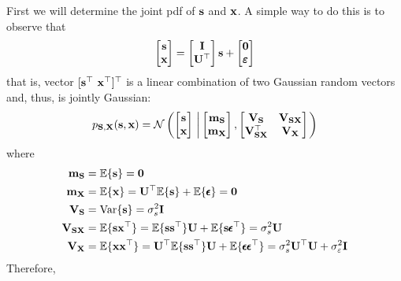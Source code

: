 First we will determine the joint pdf of ${\mathbf s}$ and ${\mathbf x}$. A simple way to do this is to observe that
\begin{equation}
\begin{bmatrix} {\mathbf s} \\ {\mathbf x} \end{bmatrix} =
	\begin{bmatrix} {\mathbf I}  \\ {\mathbf U}^\top          \end{bmatrix} {\mathbf s} + 
	\begin{bmatrix} \bf 0 \\ \pmb{\varepsilon} \end{bmatrix}
\end{equation}
%
that is, vector $[{\mathbf s}^\top~{\mathbf x}^\top]^\top$ is a linear combination of two Gaussian random vectors and, thus, is jointly Gaussian:
\begin{equation}
p_{{\bf S},{\bf X}}({\mathbf s},{\mathbf x}) 
	= {\mathcal N}\left(\begin{bmatrix} {\mathbf s} \\ {\mathbf x} \end{bmatrix}
                    \, \left| \,	                
	                \begin{bmatrix} {\bf m_S} \\ {\bf m_X} \end{bmatrix},
                    \begin{bmatrix} {\bf V_S}             & {\bf V_{SX}}   \\ 
                                    {\bf V}_{\bf SX}^\top & {\bf V_{X}}   
                    \end{bmatrix}
                    \right.
                    \right)
\end{equation}
where
\begin{align}
{\bf m_S}    &= \mathbb{E}\{{\mathbf s}\} = {\bf 0}    \\
{\bf m_X}    &= \mathbb{E}\{{\mathbf x}\} = {\bf U}^\top \mathbb{E}\{{\mathbf s}\} + \mathbb{E}\{\pmb{\epsilon}\} = {\bf 0}  \\
{\bf V_S}    &= \text{Var}\{{\mathbf s}\} = \sigma_s^2{\mathbf I}     \\
{\bf V_{SX}} &= \mathbb{E}\{{\mathbf s}{\mathbf x}^\top\} = \mathbb{E}\{{\mathbf s}{\mathbf s}^\top\} {\mathbf U} + \mathbb{E}\{{\mathbf s}\pmb{\epsilon}^\top\}  = \sigma_s^2{\mathbf U} \\
{\bf V_X} &= \mathbb{E}\{{\mathbf x}{\mathbf x}^\top\} = {\mathbf U}^\top \mathbb{E}\{{\mathbf s}{\mathbf s}^\top\} {\mathbf U} + \mathbb{E}\{\pmb{\epsilon}\pmb{\epsilon}^\top\}  
           = \sigma_s^2{\mathbf U}^\top{\mathbf U} + \sigma_\varepsilon^2 {\mathbf I}
\end{align}
Therefore,
